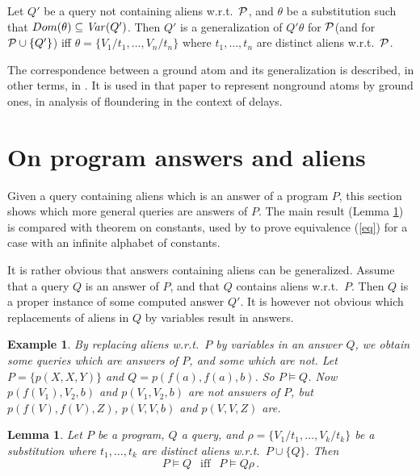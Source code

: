 \documentclass[a4paper]{tlp2}
\newtheorem{lemma}[theorem]{Lemma}
\newtheorem{example}[theorem]{Example}
\newcommand*{\seq}[2][n]  {{#2_{1}, \allowbreak \ldots, \allowbreak #2_{#1}}}
\renewcommand*{\P}{{\ensuremath{\cal P}}\xspace}
\begin{document}
Let $Q'$ be a query not containing aliens w.r.t.\ \P, and 
$\theta$ be a substitution such that $Dom(\theta)\subseteq {\it Var}(Q')$.
Then $Q'$ is a generalization of  $Q'\theta$ for \P (and for $\P\cup\{Q'\}$)
    iff  $\theta=\{V_1/t_1,\ldots,V_n/t_n\}$
    where $\seq t$ are distinct aliens w.r.t.\ \P.



 The correspondence between a ground atom and its generalization
 is described, in other terms, in
 \cite[Def.\,4]{naish.tplp.floundering14}.
It is used in that paper to represent nonground atoms by
 ground ones, in analysis of floundering in the context of delays.


\section{On program answers and aliens}
\label{sec:lemma}



Given a query containing aliens which is an answer of a program $P$,
this section shows which more general queries are answers of $P$.
The main result (Lemma \ref{lemma:alien:substitution})
is compared with theorem on constants,
used by \cite{DBLP:books/mk/minker88/Maher88} to prove 
equivalence (\ref{eq}) for a case with an infinite alphabet of constants.

It is rather obvious that answers containing aliens can be generalized.
Assume that a query
 $Q$ is an answer of $P$, and that $Q$ contains aliens w.r.t.\ $P$. 
Then $Q$ is
a proper instance of some computed answer $Q'$.
It is however not obvious which replacements of aliens in $Q$ by variables 
result in answers.


\begin{example}
By replacing aliens w.r.t.\ $P$ by variables in an answer $Q$, 
we obtain some queries which are answers of $P$,
and some which are not.
Let $P= \{p(X,X,Y)\}$ and $Q=p( f(a),f(a),b )$.
So $P\models Q$.
Now $p(f(V_1),V_2,b)$ and $p(V_1,V_2,b)$ are not answers of $P$, 
but $p(f(V),f(V),Z)$,  $p(V,V,b)$ and  $p(V,V,Z)$ are.
\end{example}



\begin{lemma}
\label{lemma:alien:substitution}  
Let $P$ be a program, $Q$ a query, and
 $\rho=\{V_1/t_1,\ldots,V_k/t_k\}$ be a substitution where
 $\seq[k]t$ are distinct aliens w.r.t.\ $P\cup\{Q\}$.  Then
\begin{equation}
\label{th:alien:substitution1}
P\models Q \ \  \mbox{ iff } \ \  P\models Q\rho\,.
\end{equation}
\end{lemma}
\end{document}
